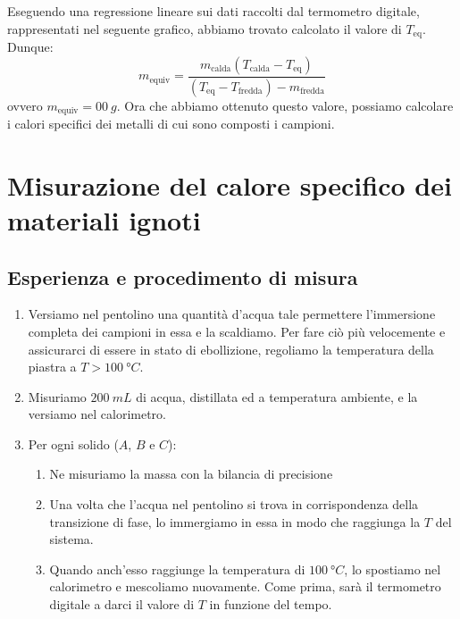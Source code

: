 \documentclass{article}
\begin{document}
Eseguendo una regressione lineare sui dati raccolti dal termometro digitale, rappresentati nel    %
seguente grafico, abbiamo trovato calcolato il valore di $T_\text{eq}$. Dunque:
    \[
        m_\text{equiv} = \frac{m_\text{calda} (T_\text{calda}-T_\text{eq})}{(T_\text{eq}-T_\text{fredda}) - m_\text{fredda}}
    \]
ovvero $m_\text{equiv} = \qty{00}{g}$. Ora che abbiamo ottenuto questo valore,    %
possiamo calcolare i calori specifici dei metalli di cui sono composti i campioni.



\section{Misurazione del calore specifico dei materiali ignoti}
    
\subsection{Esperienza e procedimento di misura}

\begin{enumerate}
    \item
        Versiamo nel pentolino una quantità d'acqua tale permettere l'immersione
        completa dei campioni in essa e la scaldiamo. Per fare ciò più velocemente
        e assicurarci di essere in stato di ebollizione, regoliamo la temperatura
        della piastra a $T>\qty{100}{\degree C}$.
    \item
        Misuriamo $\qty{200}{mL}$ di acqua, distillata ed a temperatura ambiente,
        e la versiamo nel calorimetro.
    \item
        Per ogni solido ($A$, $B$ e $C$):
    \begin{enumerate}
        \item
            Ne misuriamo la massa con la bilancia di precisione
        \item
            Una volta che l'acqua nel pentolino si trova in corrispondenza della
            transizione di fase, lo immergiamo in essa in modo che raggiunga la
            $T$ del sistema.
        \item
            Quando anch'esso raggiunge la temperatura di $\qty{100}{\degree C}$,
            lo spostiamo nel calorimetro e mescoliamo nuovamente. Come prima, sarà
            il termometro digitale a darci il valore di $T$ in funzione del tempo.
    \end{enumerate}
\end{enumerate}
\end{document}
